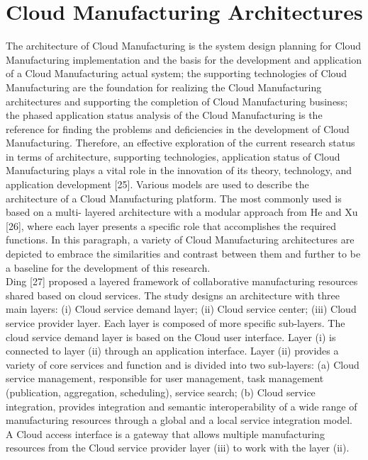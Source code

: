 \section{Cloud Manufacturing Architectures}
The architecture of Cloud Manufacturing is the system design planning for Cloud Manufacturing implementation and the basis for the development and application of a Cloud Manufacturing actual system; the supporting technologies of Cloud Manufacturing are the foundation for realizing the Cloud Manufacturing architectures and supporting the completion of Cloud Manufacturing business; the phased application status analysis of the Cloud Manufacturing is the reference for finding the problems and deficiencies in the development of Cloud Manufacturing. Therefore, an effective exploration of the current research status in terms of architecture, supporting technologies, application status of Cloud Manufacturing plays a vital role in the innovation of its theory, technology, and application development [25]. Various models are used to describe the architecture of a Cloud Manufacturing platform. The most commonly used is based on a multi- layered architecture with a modular approach from He and Xu [26], where each layer presents a specific role that accomplishes the required functions. In this paragraph, a variety of Cloud Manufacturing architectures are depicted to embrace the similarities and contrast between them and further to be a baseline for the development of this research.\\
Ding [27] proposed a layered framework of collaborative manufacturing resources shared based on cloud services. The study designs an architecture with three main layers: (i) Cloud service demand layer; (ii) Cloud service center; (iii) Cloud service provider layer. Each layer is composed of more specific sub-layers. The cloud service demand layer is based on the Cloud user interface. Layer (i) is connected to layer (ii) through an application interface. Layer (ii) provides a variety of core services and function and is divided into two sub-layers: (a) Cloud service management, responsible for user management, task management (publication, aggregation, scheduling), service search; (b) Cloud service integration, provides integration and semantic interoperability of a wide range of manufacturing resources through a global and a local service integration model. A Cloud access interface is a gateway that allows multiple manufacturing resources from the Cloud service provider layer (iii) to work with the layer (ii).

